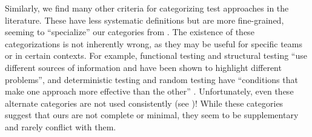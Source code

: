 \begin{itemize}
          Similarly, we find many other
          criteria for categorizing test approaches in the literature.
          These have less systematic definitions but are more
          fine-grained, seeming to ``specialize'' our categories from
          . The existence of these categorizations is not
          inherently wrong, as they may be useful for specific teams or in
          certain contexts. For example, functional testing and structural
          testing ``use different sources of information and have been shown to
          highlight different problems'', and deterministic testing and random
          testing have ``conditions that make one approach more effective than
          the other'' \citep[p.~5\=/16]{SWEBOK2025}. Unfortunately, even these
          alternate categories are not used consistently
          (see )! While these categories suggest
          that ours are not complete or minimal, they seem to be supplementary
          and rarely conflict with them.
\end{itemize}

\begin{landscape}%
    \otherCatsTable{}%
\end{landscape}

